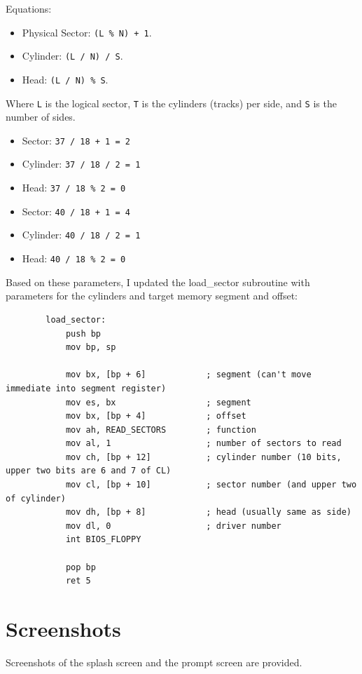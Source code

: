 \documentclass{article}
\begin{document}
    Equations:
    \begin{itemize}
        \item Physical Sector: \verb|(L % N) + 1|.
        \item Cylinder: \verb|(L / N) / S|.
        \item Head: \verb|(L / N) % S|.
    \end{itemize}
    Where \verb|L| is the logical sector, \verb|T| is the cylinders (tracks) per side, and \verb|S| is the number of sides.

    \begin{itemize}
        \item Sector: \verb|37 / 18 + 1 = 2|
        \item Cylinder: \verb|37 / 18 / 2 = 1|
        \item Head: \verb|37 / 18 % 2 = 0|
    \end{itemize}

    \begin{itemize}
        \item Sector: \verb|40 / 18 + 1 = 4|
        \item Cylinder: \verb|40 / 18 / 2 = 1|
        \item Head: \verb|40 / 18 % 2 = 0|
    \end{itemize}

    Based on these parameters, I updated the load\_sector subroutine with parameters for the cylinders and target memory segment and offset:
    \begin{lstlisting}
        load_sector:
            push bp
            mov bp, sp

            mov bx, [bp + 6]            ; segment (can't move immediate into segment register)
            mov es, bx                  ; segment
            mov bx, [bp + 4]            ; offset
            mov ah, READ_SECTORS        ; function
            mov al, 1                   ; number of sectors to read
            mov ch, [bp + 12]           ; cylinder number (10 bits, upper two bits are 6 and 7 of CL)
            mov cl, [bp + 10]           ; sector number (and upper two of cylinder)
            mov dh, [bp + 8]            ; head (usually same as side)
            mov dl, 0                   ; driver number
            int BIOS_FLOPPY

            pop bp
            ret 5
    \end{lstlisting}

    \section{Screenshots}\label{sec:screenshots}
    Screenshots of the splash screen and the prompt screen are provided.
\end{document}
